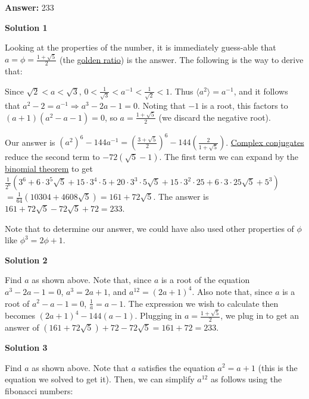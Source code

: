 \begin{enumerate}
 
 \textbf{Answer: }233



\textbf{Solution 1}

Looking at the properties of the number, it is immediately guess-able that $a = \phi = \frac{1+\sqrt{5}}2$ (the \href{https://artofproblemsolving.com/wiki/index.php?title=Phi}{golden ratio}) is the answer. The following is the way to derive that:

 Since $\sqrt{2} < a < \sqrt{3}$, $0 < \frac{1}{\sqrt{3}} < a^{-1} < \frac{1}{\sqrt{2}} < 1$. Thus $\langle a^2 \rangle = a^{-1}$, and it follows that $a^2 - 2 = a^{-1} \Longrightarrow a^3 - 2a - 1 = 0$. Noting that $-1$ is a root, this factors to $(a+1)(a^2 - a - 1) = 0$, so $a = \frac{1 + \sqrt{5}}{2}$ (we discard the negative root).

 Our answer is $(a^2)^{6}-144a^{-1} = \left(\frac{3+\sqrt{5}}2\right)^6 - 144\left(\frac{2}{1 + \sqrt{5}}\right)$. \href{https://artofproblemsolving.com/wiki/index.php?title=Complex\_conjugate}{Complex conjugates} reduce the second term to $-72(\sqrt{5}-1)$. The first term we can expand by the \href{https://artofproblemsolving.com/wiki/index.php?title=Binomial\_theorem}{binomial theorem} to get $\frac 1{2^6}\left(3^6 + 6\cdot 3^5\sqrt{5} + 15\cdot 3^4 \cdot 5 + 20\cdot 3^3 \cdot 5\sqrt{5} + 15 \cdot 3^2 \cdot 25 + 6 \cdot 3 \cdot 25\sqrt{5} + 5^3\right)$ $= \frac{1}{64}\left(10304 + 4608\sqrt{5}\right) = 161 + 72\sqrt{5}$. The answer is $161 + 72\sqrt{5} - 72\sqrt{5} + 72 = \boxed{233}$.

 Note that to determine our answer, we could have also used other properties of $\phi$ like $\phi^3 = 2\phi + 1$.

 



\textbf{Solution 2}

Find $a$ as shown above. Note that, since $a$ is a root of the equation $a^3 - 2a - 1 = 0$, $a^3 = 2a + 1$, and $a^{12} = (2a + 1)^4$. Also note that, since $a$ is a root of $a^2 - a - 1 = 0$, $\frac{1}{a} = a - 1$. The expression we wish to calculate then becomes $(2a + 1)^4 - 144(a - 1)$. Plugging in $a = \frac{1 + \sqrt{5}}{2}$, we plug in to get an answer of $(161 + 72\sqrt{5}) + 72 - 72\sqrt{5} = 161 + 72 = \boxed{233}$.

 



\textbf{Solution 3}

Find $a$ as shown above. Note that $a$ satisfies the equation $a^2 = a+1$ (this is the equation we solved to get it). Then, we can simplify $a^{12}$ as follows using the fibonacci numbers:


\end{enumerate}
